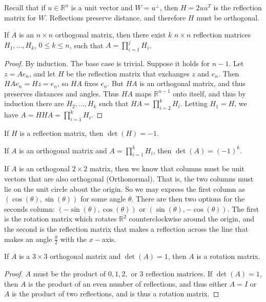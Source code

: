 \documentclass[crop=false,class=book,oneside]{standalone}                      %
\begin{document}
        Recall that if $u\in \mathbb{R}^n$ is a unit vector and $W = u^{\perp}$, then $H=2uu^T$ is the reflection matrix for $W$. Reflections preserve distance, and therefore $H$ must be orthogonal.
        \newpage
        \begin{theorem}
        If $A$ is an $n\times n$ orthogonal matrix, then there exist $k$ $n\times n$ reflection matrices $H_1,\hdots, H_k$, $0\leq k \leq n$, such that $A = \prod_{i=1}^{j}H_i$.
        \end{theorem}
        \begin{proof}
        By induction. The base case is trivial. Suppose it holds for $n-1$. Let $z = Ae_n$, and let $H$ be the reflection matrix that exchanges $z$ and $e_n$. Then $HAe_n = Hz = e_n$, so $HA$ fixes $e_n$. But $HA$ is an orthogonal matrix, and thus preserves distances and angles. Thus $HA$ maps $\mathbb{R}^{n-1}$ onto itself, and thus by induction there are $H_2,\hdots, H_k$ such that $HA = \prod_{i=2}^{k} H_i$. Letting $H_{1}=H$, we have $A = HHA = \prod_{i=1}^{k}H_i$.
        \end{proof}
        \begin{theorem}
        If $H$ is a reflection matrix, then $\det(H) = -1$.
        \end{theorem}
        \begin{theorem}
        If $A$ is an orthogonal matrix and $A=\prod_{i=1}^{k} H_i$, then $\det(A) = (-1)^k$.
        \end{theorem}
        If $A$ is an orthogonal $2\times 2$ matrix, then we know that columns must be unit vectors that are also orthogonal (Orthonormal). That is, the two columns must lie on the unit circle about the origin. So we may express the first column as $(\cos(\theta),\sin(\theta))$ for some angle $\theta$. There are then two options for the seconds column: $(-\sin(\theta),\cos(\theta))$ or $(\sin(\theta),-\cos(\theta))$. The first is the rotation matrix which rotates $\mathbb{R}^2$ counterclockwise around the origin, and the second is the reflection matrix that makes a reflection across the line that makes an angle $\frac{\theta}{2}$ with the $x-$axis. 
        \begin{theorem}
        If $A$ is a $3\times 3$ orthogonal matrix and $\det(A) = 1$, then $A$ is a rotation matrix.
        \end{theorem}
        \begin{proof}
        $A$ must be the product of $0,1,2,$ or $3$ reflection matrices. If $\det(A) = 1$, then $A$ is the product of an even number of reflections, and thus either $A=I$ or $A$ is the product of two reflections, and is thus a rotation matrix.
        \end{proof}
\end{document}
